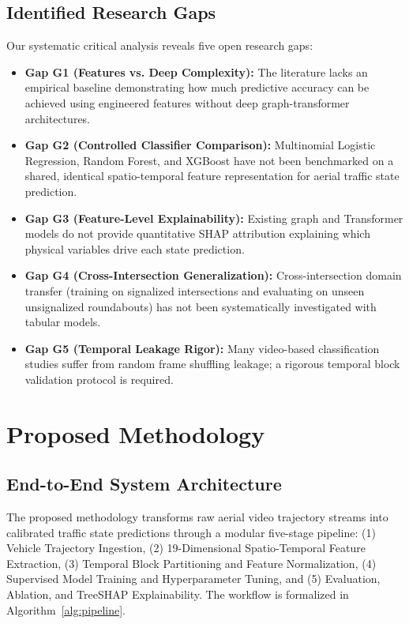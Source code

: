 \documentclass[conference]{IEEEtran}
\begin{document}
\subsection{Identified Research Gaps}
Our systematic critical analysis reveals five open research gaps:
\begin{itemize}
    \item \textbf{Gap G1 (Features vs. Deep Complexity):} The literature lacks an empirical baseline demonstrating how much predictive accuracy can be achieved using engineered features without deep graph-transformer architectures.
    \item \textbf{Gap G2 (Controlled Classifier Comparison):} Multinomial Logistic Regression, Random Forest, and XGBoost have not been benchmarked on a shared, identical spatio-temporal feature representation for aerial traffic state prediction.
    \item \textbf{Gap G3 (Feature-Level Explainability):} Existing graph and Transformer models do not provide quantitative SHAP attribution explaining which physical variables drive each state prediction.
    \item \textbf{Gap G4 (Cross-Intersection Generalization):} Cross-intersection domain transfer (training on signalized intersections and evaluating on unseen unsignalized roundabouts) has not been systematically investigated with tabular models.
    \item \textbf{Gap G5 (Temporal Leakage Rigor):} Many video-based classification studies suffer from random frame shuffling leakage; a rigorous temporal block validation protocol is required.
\end{itemize}

\section{Proposed Methodology}

\subsection{End-to-End System Architecture}
The proposed methodology transforms raw aerial video trajectory streams into calibrated traffic state predictions through a modular five-stage pipeline: (1) Vehicle Trajectory Ingestion, (2) 19-Dimensional Spatio-Temporal Feature Extraction, (3) Temporal Block Partitioning and Feature Normalization, (4) Supervised Model Training and Hyperparameter Tuning, and (5) Evaluation, Ablation, and TreeSHAP Explainability. The workflow is formalized in Algorithm~\ref{alg:pipeline}.
\end{document}
